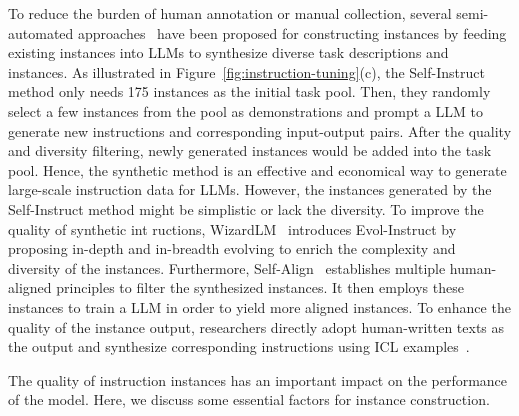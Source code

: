 To reduce the burden of human annotation or manual collection, several semi-automated approaches~\cite{Wang-arXiv-2022-Self} have been proposed for constructing instances by feeding existing instances into LLMs to synthesize diverse task descriptions and {instances}. As illustrated in Figure~\ref{fig:instruction-tuning}(c), the Self-Instruct method only needs 175 instances as the initial task pool. Then, they randomly select a few instances from the pool as demonstrations and prompt a LLM to generate new instructions and corresponding input-output pairs. After the quality and diversity filtering, newly generated instances would  be added into the task pool. Hence, the synthetic method is an effective and economical way to generate large-scale instruction data for LLMs. 
{However, the instances generated by the Self-Instruct method might be  simplistic or lack the diversity. To improve the quality of  synthetic int ructions,  WizardLM~\cite{Xu-arxiv-2023-WizardLM} introduces Evol-Instruct by proposing in-depth and in-breadth evolving to enrich the complexity and diversity of the instances. Furthermore, Self-Align~\cite{Sun-arxiv-2023-Principle} establishes multiple human-aligned principles to filter the synthesized instances. It then employs these instances to train a LLM in order to yield more aligned instances. To enhance the quality of the instance output, researchers directly adopt human-written texts as the output and synthesize corresponding instructions using ICL examples~\cite{Li-arxiv-2023-Self}.}





The quality of instruction instances has an important impact on the performance of the model. 
Here, we discuss some essential factors for instance construction. 

